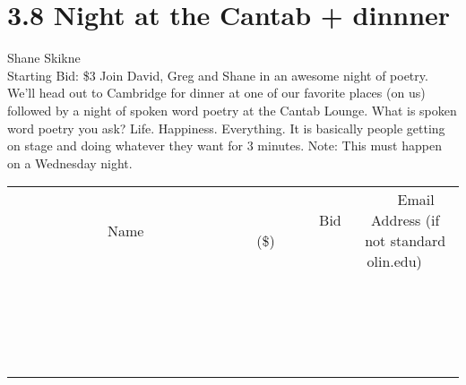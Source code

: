 \documentclass[11pt]{article}
\begin{document}
\section*{3.8 Night at the Cantab + dinnner}
Shane Skikne
\\
Starting Bid: \$3
\newline
Join David, Greg and Shane in an awesome night of poetry. We'll head out to Cambridge for dinner at one of our favorite places (on us) followed by a night of spoken word poetry at the Cantab Lounge. What is spoken word poetry you ask? Life. Happiness. Everything. It is basically people getting on stage and doing whatever they want for 3 minutes. Note: This must happen on a Wednesday night.
\\[3ex]
\begin{tabular}{c c c}
~~~~~~~~~~~~~Name~~~~~~~~~~~~~ & ~~~~~~~~~Bid (\$)~~~~~~~~~  & ~~~Email Address (if not standard olin.edu)~~~\\
 & & \\
\hline
 & & \\
\hline
 & & \\
\hline
 & & \\
\hline
 & & \\
\hline
 & & \\
\hline
 & & \\
\hline
 & & \\
\hline
 & & \\
\hline
 & & \\
\hline
 & & \\
\hline
 & & \\
\hline
 & & \\
\hline
 & & \\
\hline
 & & \\
\hline
 & & \\
\hline
 & & \\
\hline
 & & \\
\hline
 & & \\
\hline
\end{tabular}
\newpage
\end{document}
